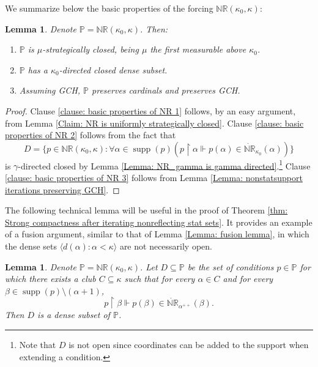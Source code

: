 \documentclass[11pt]{amsart}
\renewcommand{\restriction}{\mathbin\upharpoonright}    %
\newtheorem{lemma}[theorem]{Lemma}
\theoremstyle{definition}
\newcounter{condition}
\theoremstyle{remark}
\newcommand\<{{<}}
\DeclareMathOperator{\supp}{supp}
\newcommand{\po}{\mathbb{P}}
\begin{document}
    
    We summarize below the basic properties of the forcing $\mathbb{NR}(\kappa_0, \kappa)$:
    
    
    \begin{lemma}\label{lemma: properties of NR(kappa0,kappa)}
        Denote $\po = \mathbb{NR}(\kappa_0, \kappa)$. Then:
        \begin{enumerate}
            \item \label{clause: basic properties of NR 1} $\po$ is $\mu$-strategically closed, being $\mu$  the first measurable  above $\kappa_0$. 
            \item \label{clause: basic properties of NR 2} $\po$ has a $\kappa_0$-directed closed dense subset.
            \item \label{clause: basic properties of NR 3} Assuming {\rm{GCH}}, $\po$ preserves cardinals and preserves {\rm{GCH}}.
        \end{enumerate}
    \end{lemma}

    \begin{proof}
        Clause \eqref{clause: basic properties of NR 1} follows, by an easy argument,  from Lemma \ref{Claim: NR is uniformly strategically closed}. 
        Clause \eqref{clause: basic properties of NR 2} follows from the fact that 
         $$D = \{ p\in \mathbb{NR}(\kappa_0, \kappa) \colon \forall \alpha\in \supp(p) \left( p\restriction \alpha \Vdash p(\alpha)\in \dot{\mathbb{NR}}_{\kappa_0}(\alpha) \right) \}$$
         is $\gamma$-directed closed by Lemma \ref{Lemma: NR_gamma is gamma directed}.\footnote{Note that $D$ is not open since coordinates can be added to the support when extending a condition.} Clause \eqref{clause: basic properties of NR 3} follows from Lemma \ref{Lemma: nonstatsupport iterations preserving GCH}.
    \end{proof}

    The following technical lemma will be useful in the proof of Theorem \ref{thm: Strong compactness after iterating nonreflecting stat sets}. It provides an example of a fusion argument, similar to that of Lemma \ref{Lemma: fusion lemma}, in which the dense sets $\langle d(\alpha) \colon \alpha<\kappa\rangle$ are not necessarily open.

    \begin{lemma}\label{lem: technical lemma for the proof of strong compactness}
        Denote $\po = \mathbb{NR}(\kappa_0, \kappa)$. Let $D\subseteq \po$ be the set of conditions $p\in \po$ for which there exists a club $C\subseteq \kappa$ such that for every $\alpha\in C$ and for every $\beta\in \supp(p)\setminus (\alpha+1)$,
        $$ p\restriction \beta \Vdash p(\beta) \in \dot{\mathbb{NR}}_{\alpha^{++}}(\beta). $$
        Then $D$ is a dense subset of $\po$.
    \end{lemma}
\end{document}
